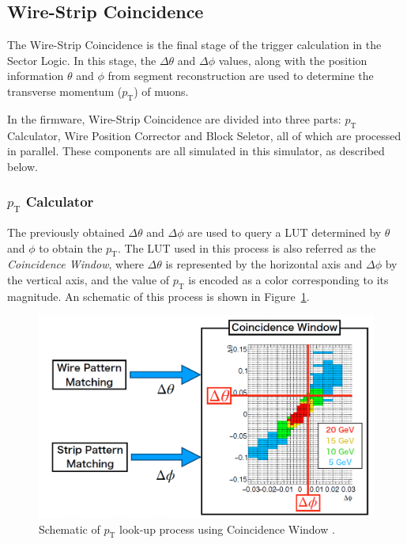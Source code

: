 \subsection{Wire-Strip Coincidence} \label{subsec:WireStripCoin}
The Wire-Strip Coincidence is the final stage of the trigger calculation in the Sector Logic. In this stage, the $\Delta\theta$ and $\Delta\phi$ values, along with the position information $\theta$ and $\phi$ from segment reconstruction are used to determine the transverse momentum ($p_{\mathrm{T}}$) of muons.

In the firmware, Wire-Strip Coincidence are divided into three parts: $p_{\mathrm{T}}$ Calculator, Wire Position Corrector and Block Seletor, all of which are processed in parallel. These components are all simulated in this simulator, as described below.

\subsubsection{$p_{\mathrm{T}}$ Calculator}

The previously obtained $\Delta\theta$ and $\Delta\phi$ are used to query a LUT determined by $\theta$ and $\phi$  to obtain the $p_{\mathrm{T}}$. The LUT used in this process is also referred as the \textit{Coincidence Window}, where $\Delta\theta$ is represented by the horizontal axis and $\Delta\phi$ by the vertical axis, and the value of $p_{\mathrm{T}}$ is encoded as a color corresponding to its magnitude. An schematic of this process is shown in Figure~\ref{fig:coin_window}.

\begin{figure}[htbp]
  \centering
  \includegraphics[width=1.0\textwidth]{figs/chapter5/coin_window.png}
  \caption{Schematic of $p_\mathrm{T}$ look-up process using Coincidence Window \cite{EndcapSLPDR}.}
  \label{fig:coin_window}
\end{figure}

